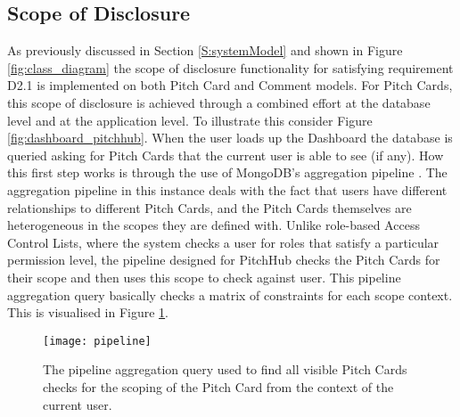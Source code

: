 \subsection{Scope of Disclosure}
As previously discussed in Section \ref{S:systemModel} and shown in Figure \ref{fig:class_diagram} the scope of disclosure functionality for satisfying requirement D2.1 is implemented on both Pitch Card and Comment models. For Pitch Cards, this scope of disclosure is achieved through a combined effort at the database level and at the application level. To illustrate this consider Figure \ref{fig:dashboard_pitchhub}. When the user loads up the Dashboard the database is queried asking for Pitch Cards that the current user is able to see (if any). How this first step works is through the use of MongoDB's aggregation pipeline \cite{Aggre7:online}. The aggregation pipeline in this instance deals with the fact that users have different relationships to different Pitch Cards, and the Pitch Cards themselves are heterogeneous in the scopes they are defined with. Unlike role-based Access Control Lists, where the system checks a user for roles that satisfy a particular permission level, the pipeline designed for PitchHub checks the Pitch Cards for their scope and then uses this scope to check against user. This pipeline aggregation query basically checks a matrix of constraints for each scope context. This is visualised in Figure \ref{fig:pipeline}.

\begin{figure}[ht]
    \centering
    \texttt{[image: pipeline]}
    \caption{The pipeline aggregation query used to find all visible Pitch Cards checks for the scoping of the Pitch Card from the context of the current user.}
    \label{fig:pipeline}
\end{figure}

